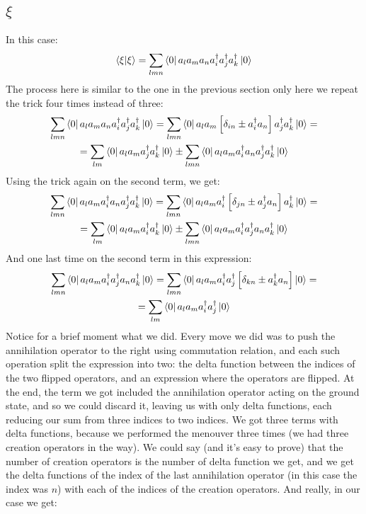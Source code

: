 \documentclass{article}
\begin{document}
\subsection{$\xi$}
In this case:
\begin{equation}
    \braket{\xi}{\xi} =
        \sum_{lmn} \bra{0} a_l a_m a_n a^\dagger_i a^\dagger_j a^\dagger_k \ket{0}
\end{equation}
The process here is similar to the one in the previous section only here we repeat the trick four times instead of three:
\begin{equation}
\begin{gathered}
        \sum_{lmn} \bra{0} a_l a_m a_n a^\dagger_i a^\dagger_j a^\dagger_k \ket{0} = 
        \sum_{lmn} \bra{0} a_l a_m \left[\delta_{in} \pm a^\dagger_i a_n\right] a^\dagger_j a^\dagger_k \ket{0} = \\ =
        \sum_{lm} \bra{0} a_l a_m a^\dagger_j a^\dagger_k \ket{0} \pm
        \sum_{lmn} \bra{0} a_l a_m a^\dagger_i a_n a^\dagger_j a^\dagger_k \ket{0}
\end{gathered}
\end{equation}
Using the trick again on the second term, we get:
\begin{equation}
\begin{gathered}
        \sum_{lmn} \bra{0} a_l a_m a^\dagger_i a_n a^\dagger_j a^\dagger_k \ket{0} =
        \sum_{lmn} \bra{0} a_l a_m a^\dagger_i \left[\delta_{jn} \pm a^\dagger_j a_n\right] a^\dagger_k \ket{0} = \\ =
        \sum_{lm} \bra{0} a_l a_m a^\dagger_i a^\dagger_k \ket{0} \pm
        \sum_{lmn} \bra{0} a_l a_m a^\dagger_i  a^\dagger_j a_n a^\dagger_k \ket{0}
\end{gathered}
\end{equation}
And one last time on the second term in this expression:
\begin{equation}
\begin{gathered}
    \sum_{lmn} \bra{0} a_l a_m a^\dagger_i  a^\dagger_j a_n a^\dagger_k \ket{0} =
    \sum_{lmn} \bra{0} a_l a_m a^\dagger_i a^\dagger_j \left[\delta_{kn} \pm a^\dagger_k a_n\right] \ket{0} = \\ =
    \sum_{lm} \bra{0} a_l a_m a^\dagger_i a^\dagger_j \ket{0}
\end{gathered}
\end{equation}
Notice for a brief moment what we did. Every move we did was to push the annihilation operator to the right using commutation relation, and each such operation split the expression into two: the delta function between the indices of the two flipped operators, and an expression where the operators are flipped. At the end, the term we got included the annihilation operator acting on the ground state, and so we could discard it, leaving us with only delta functions, each reducing our sum from three indices to two indices. We got three terms with delta functions, because we performed the menouver three times (we had three creation operators in the way). We could say (and it's easy to prove) that the number of creation operators is the number of delta function we get, and we get the delta functions of the index of the last annihilation operator (in this case the index was $n$) with each of the indices of the creation operators. And really, in our case we get:
\end{document}
